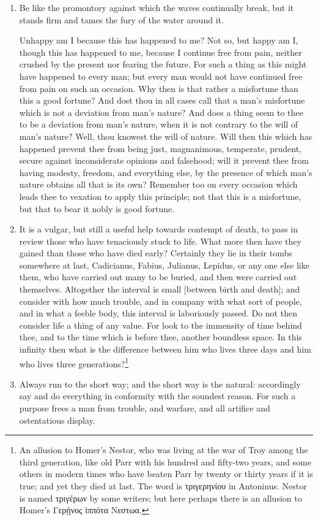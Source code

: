 \begin{enumerate}
\item Be like the promontory against which the waves continually break, but it stands firm and tames the fury of the water around it.

Unhappy am I because this has happened to me? Not so, but happy am I, though this has happened to me, because I continue free from pain, neither crushed by the present nor fearing the future. For such a thing as this might have happened to every man; but every man would not have continued free from pain on such an occasion. Why then is that rather a misfortune than this a good fortune? And dost thou in all cases call that a man's misfortune which is not a deviation from man's nature? And does a thing seem to thee to be a deviation from man's nature, when it is not contrary to the will of man's nature? Well, thou knowest the will of nature. Will then this which has happened prevent thee from being just, magnanimous, temperate, prudent, secure against inconsiderate opinions and falsehood; will it prevent thee from having modesty, freedom, and everything else, by the presence of which man's nature obtains all that is its own? Remember too on every occasion which leads thee to vexation to apply this principle; not that this is a misfortune, but that to bear it nobly is good fortune.

\item It is a vulgar, but still a useful help towards contempt of death, to pass in review those who have tenaciously stuck to life. What more then have they gained than those who have died early? Certainly they lie in their tombs somewhere at last, Cadicianus, Fabius, Julianus, Lepidus, or any one else like them, who have carried out many to be buried, and then were carried out themselves. Altogether the interval is small [{\clarify between birth and death}]; and consider with how much trouble, and in company with what sort of people, and in what a feeble body, this interval is laboriously passed. Do not then consider life a thing of any value. For look to the immensity of time behind thee, and to the time which is before thee, another boundless space. In this infinity then what is the difference between him who lives three days and him who lives three generations?\footnote{An allusion to Homer's Nestor, who was living at the war of Troy among the third generation, like old Parr with his hundred and fifty-two years, and some others in modern times who have beaten Parr by twenty or thirty years if it is true; and yet they died at last. The word is \textgreek{τριγερηνίου} in Antoninus. Nestor is named \textgreek{τριγέρων} by some writers; but here perhaps there is an allusion to Homer's \textgreek{Γερῄνος ἱππότα Νεστωα}.}

\item Always run to the short way; and the short way is the natural: accordingly say and do everything in conformity with the soundest reason. For such a purpose frees a man from trouble, and warfare, and all artifice and ostentatious display.
\end{enumerate}